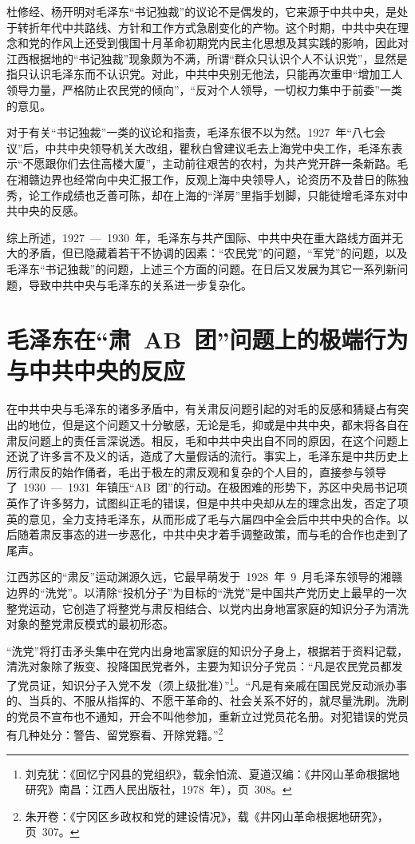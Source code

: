 杜修经、杨开明对毛泽东“书记独裁”的议论不是偶发的，它来源于中共中央，是处于转折年代中共路线、方针和工作方式急剧变化的产物。这个时期，中共中央在理念和党的作风上还受到俄国十月革命初期党内民主化思想及其实践的影响，因此对江西根据地的“书记独裁”现象颇为不满，所谓“群众只认识个人不认识党”，显然是指只认识毛泽东而不认识党。对此，中共中央别无他法，只能再次重申“增加工人领导力量，严格防止农民党的倾向”，“反对个人领导，一切权力集中于前委”一类的意见。

对于有关“书记独裁”一类的议论和指责，毛泽东很不以为然。1927~年“八七会议”后，中共中央领导机关大改组，瞿秋白曾建议毛去上海党中央工作，毛泽东表示“不愿跟你们去住高楼大厦”，主动前往艰苦的农村，为共产党开辟一条新路。毛在湘赣边界也经常向中央汇报工作，反观上海中央领导人，论资历不及昔日的陈独秀，论工作成绩也乏善可陈，却在上海的“洋房”里指手划脚，只能徒增毛泽东对中共中央的反感。

综上所述，1927~—~1930~年，毛泽东与共产国际、中共中央在重大路线方面并无大的矛盾，但已隐藏着若干不协调的因素：“农民党”的问题，“军党”的问题，以及毛泽东“书记独裁”的问题，上述三个方面的问题。在日后又发展为其它一系列新问题，导致中共中央与毛泽东的关系进一步复杂化。

\section{毛泽东在“肃~AB~团”问题上的极端行为与中共中央的反应}

在中共中央与毛泽东的诸多矛盾中，有关肃反问题引起的对毛的反感和猜疑占有突出的地位，但是这个问题又十分敏感，无论是毛，抑或是中共中央，都未将各自在肃反问题上的责任言深说透。相反，毛和中共中央出自不同的原因，在这个问题上还说了许多言不及义的话，造成了大量假话的流行。事实上，毛泽东是中共历史上厉行肃反的始作俑者，毛出于极左的肃反观和复杂的个人目的，直接参与领导了~1930~—~1931~年镇压“AB~团”的行动。在极困难的形势下，苏区中央局书记项英作了许多努力，试图纠正毛的错误，但是中共中央却从左的理念出发，否定了项英的意见，全力支持毛泽东，从而形成了毛与六届四中全会后中共中央的合作。以后随着肃反事态的进一步恶化，中共中央才着手调整政策，而与毛的合作也走到了尾声。

江西苏区的“肃反”运动渊源久远，它最早萌发于~1928~年~9~月毛泽东领导的湘赣边界的“洗党”。以清除“投机分子”为目标的“洗党”是中国共产党历史上最早的一次整党运动，它创造了将整党与肃反相结合、以党内出身地富家庭的知识分子为清洗对象的整党肃反模式的最初形态。

“洗党”将打击矛头集中在党内出身地富家庭的知识分子身上，根据若于资料记载，清洗对象除了叛变、投降国民党者外，主要为知识分子党员：“凡是农民党员都发了党员证，知识分子入党不发（须上级批准）”\footnote{刘克犹：《回忆宁冈县的党组织》，载余怕流、夏道汉编：《井冈山革命根据地研究》南昌：江西人民出版社，1978~年），页~308。}。“凡是有亲戚在国民党反动派办事的、当兵的、不服从指挥的、不愿干革命的、社会关系不好的，就尽量洗刷。洗刷的党员不宣布也不通知，开会不叫他参加，重新立过党员花名册。对犯错误的党员有几种处分：警告、留党察看、开除党籍。”\footnote{朱开卷：《宁冈区乡政权和党的建设情况》，载《井冈山革命根据地研究》，页~307。}

